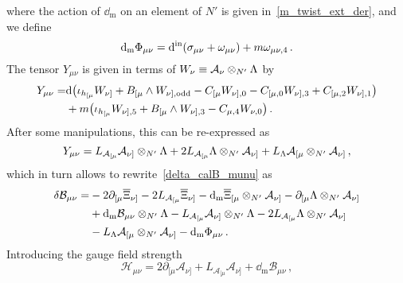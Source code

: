\documentclass[debug]{phd}
\begin{document}
					where the action of $\dd_{\mathrm{m}}$ on an element of $N'$ is given in~\eqref{m_twist_ext_der}, and we define 
							\begin{equation}\label{dmOnPhimunu}
								\mathrm{d}_{\mathrm{m}}\Phi_{\mu\nu} = \mathrm{d^{\text{in}}} (\sigma_{\mu\nu} + \omega_{\mu\nu}) + m \omega_{\mu\nu,4} \,.
							\end{equation}
					The tensor $Y_{\mu\nu}$ is given in terms of $W_\nu \equiv \mathcal{A}_\nu \otimes_{N'} \Lambda$ by
							\begin{equation}
								\begin{split}
									Y_{\mu\nu} =	& \mathrm{d} \big( \iota_{h_{[\mu}} W_{\nu]} + B_{[\mu}\wedge W_{\nu],{\rm odd}} - C_{[\mu}W_{\nu],0} - C_{[\mu,0} W_{\nu],3} + C_{[\mu,2}W_{\nu],1} \big) \\
												& + m\big(\iota_{h_{[\mu}} W_{\nu],5} + B_{[\mu}\wedge W_{\nu],3} -C_{\mu,4}W_{\nu,0} \big) \, .
								\end{split}
							\end{equation}
					After some manipulations, this can be re-expressed as
							\begin{equation}
								Y_{\mu\nu}= L_{\mathcal{A_{[\mu}}}\mathcal{A}_{\nu]} \otimes_{N'} \Lambda + 2 L_{\mathcal{A_{[\mu}}}\Lambda \otimes_{N'} \mathcal{A}_{\nu]} + L_\Lambda \mathcal{A}_{[\mu} \otimes_{N'} \mathcal{A}_{\nu]}\,,
							\end{equation}
					which in turn allows to rewrite~\eqref{delta_calB_munu} as
							\begin{equation}
								\begin{split}
									\delta \mathcal{B}_{\mu\nu} =	& -2\partial_{[\mu} \overline{\Xi}_{\nu]} - 2 L_{\mathcal A_{[\mu}} \overline{\Xi}_{\nu]} - \mathrm{d}_{\mathrm{m}} \overline{\Xi}_{[\mu} \otimes_{N'} \mathcal{A}_{\nu]} - \partial_{[\mu} \Lambda \otimes_{N'} \mathcal{A}_{\nu]} \\
															&+ \mathrm{d}_{\mathrm{m}} \mathcal{B}_{\mu\nu}\otimes_{N'} \Lambda - L_{\mathcal{A_{[\mu}}}\mathcal{A}_{\nu]} \otimes_{N'} \Lambda - 2 L_{\mathcal{A_{[\mu}}}\Lambda \otimes_{N'} \mathcal{A}_{\nu]} \\
															& - L_\Lambda \mathcal{A}_{[\mu} \otimes_{N'} \mathcal{A}_{\nu]} - \mathrm{d}_{\mathrm{m}}\Phi_{\mu\nu} \, .
								\end{split}
							\end{equation}
					Introducing the gauge field strength
							\begin{equation}\label{eq:defHmunu}
								\mathcal{H}_{\mu\nu} = 2 \partial_{[\mu}\mathcal{A}_{\nu]} + L_{\mathcal{A}_{[\mu}}\mathcal A_{\nu]} + \dd_{\mathrm{m}} \mathcal{B}_{\mu\nu}\,,
							\end{equation}
\end{document}
